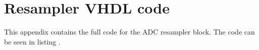 \chapter{Resampler VHDL code} \label{App:ResamplerCode}

This appendix contains the full code for the ADC resampler block. The code can be seen in listing .

